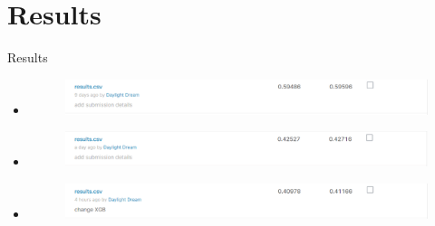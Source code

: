 \documentclass[
 size=14pt,
 paper=smartboard,  %
 mode=present, 		%
 display=slides, 	%
 style=tuliplab,  	%
 pauseslide,
 fleqn,leqno]{powerdot}
\begin{document}










\section{Results}
\begin{slide}{Results}
  \begin{itemize}
    \item \begin{figure}\includegraphics[scale=0.3]{figures/21.eps}\end{figure}
    \item \begin{figure}\includegraphics[scale=0.3]{figures/22.eps}\end{figure}
    \item \begin{figure}\includegraphics[scale=0.3]{figures/23.eps}\end{figure}
  \end{itemize}
\end{slide}
\end{document}
